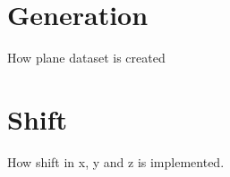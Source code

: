 \section{Generation}

How plane dataset is created

\section{Shift}

How shift in x, y and z is implemented.


